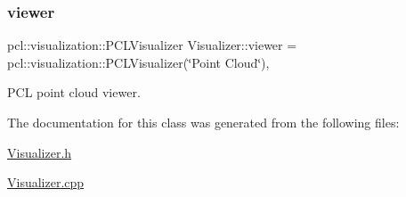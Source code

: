 \subsubsection{\texorpdfstring{viewer}{viewer}}
{\footnotesize\ttfamily pcl\+::visualization\+::\+P\+C\+L\+Visualizer Visualizer\+::viewer = pcl\+::visualization\+::\+P\+C\+L\+Visualizer(\char`\"{}Point Cloud\char`\"{})\hspace{0.3cm}{\ttfamily [static]}, {\ttfamily [private]}}



P\+CL point cloud viewer. 



The documentation for this class was generated from the following files\+:\begin{DoxyCompactItemize}
\item 
\hyperlink{_visualizer_8h}{Visualizer.\+h}\item 
\hyperlink{_visualizer_8cpp}{Visualizer.\+cpp}\end{DoxyCompactItemize}
